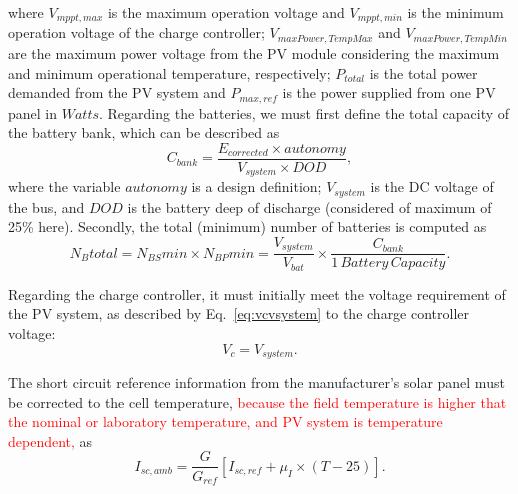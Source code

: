 \documentclass[10pt,conference]{IEEEtran}
\begin{document}
\noindent where $V_{mppt,max}$ is the maximum operation voltage and $V_{mppt,min}$ is the minimum operation voltage of the charge controller; $V_{maxPower,TempMax}$ and $V_{maxPower,TempMin}$ are the maximum power voltage from the PV module considering the maximum and minimum operational temperature, respectively; $P_{total}$ is the total power demanded from the PV system and $P_{max,ref}$ is the power supplied from one PV panel in $Watts$.
%
Regarding the batteries, we must first define the total capacity of the battery bank, which can be described as
\begin{equation}
\label{eq:Cbank}
\scriptstyle C_{bank} \scriptstyle = \dfrac{\scriptstyle E_{corrected} \scriptstyle \times \scriptstyle autonomy}{\scriptstyle V_{system} \scriptstyle \times \scriptstyle DOD},
\end{equation}
%
\noindent where the variable $autonomy$ is a design definition; %
$ V_{system} $ is the DC voltage of the bus, and $ DOD $ is the battery deep of discharge (considered of maximum of 25\% here).
%
Secondly, the total (minimum) number of batteries is computed as 
\begin{equation}
\label{eq:Nbtotal}
\scriptstyle N_{B}total = \scriptstyle N_{BS}min \scriptstyle \times \scriptstyle N_{BP}min = \dfrac{\scriptstyle V_{system}}{\scriptstyle V_{bat}} \scriptstyle \times \dfrac{\scriptstyle C_{bank}}{\scriptstyle 1 \,Battery \, Capacity}.
\end{equation}

Regarding the charge controller, it must initially meet the voltage requirement of the PV system, as described by Eq.~\eqref{eq:vcvsystem} to the charge controller voltage: 
\begin{equation}
\label{eq:vcvsystem}
\scriptstyle V_{c} = \scriptstyle V_{system}.
\end{equation}

The short circuit reference information from the manufacturer's solar panel must be corrected to the cell temperature, \textcolor{red}{because the field temperature is higher that the nominal or laboratory temperature, and PV system is temperature dependent,} as 
%
\begin{equation}
\label{eq:iscamb}
\scriptstyle I_{sc,amb} = \dfrac{\scriptstyle G}{\scriptstyle G_{ref}} \left[ \scriptstyle I_{sc,ref} + \scriptstyle \mu_{I} \scriptstyle \times \scriptstyle (T-25) \right]. 
\end{equation}
\end{document}
